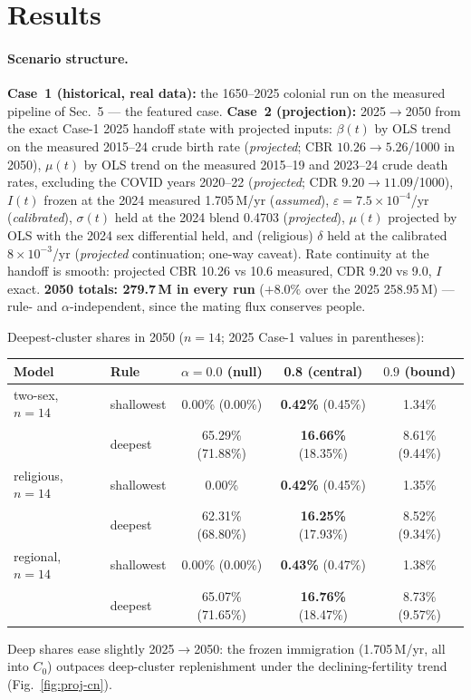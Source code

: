 \documentclass[11pt,a4paper]{article}
\begin{document}
\section{Results}
\label{sec:results}
\paragraph{Scenario structure.} \textbf{Case~1 (historical, real data):}
the 1650--2025 colonial run on the measured pipeline of Sec.~5 --- the
featured case.  \textbf{Case~2 (projection):} 2025$\to$2050 from the
exact Case-1 2025 handoff state with projected inputs: $\beta(t)$ by OLS
trend on the measured 2015--24 crude birth rate (\emph{projected}; CBR
$10.26\to5.26$/1000 in 2050), $\mu(t)$ by OLS trend on the measured
2015--19 and 2023--24 crude death rates, excluding the COVID years
2020--22 (\emph{projected}; CDR $9.20\to11.09$/1000), $I(t)$ frozen at
the 2024 measured 1.705\,M/yr (\emph{assumed}),
$\varepsilon=7.5\times10^{-4}$/yr (\emph{calibrated}),
$\sigma(t)$ held at the 2024 blend 0.4703 (\emph{projected}),
$\mu(t)$ projected by OLS with the 2024 sex differential held, and
(religious) $\delta$ held at the calibrated $8\times10^{-3}$/yr (\emph{projected}
continuation; one-way caveat).  Rate continuity at the handoff is smooth:
projected CBR 10.26 vs 10.6 measured, CDR 9.20 vs 9.0, $I$ exact.
\textbf{2050 totals: 279.7\,M in every run} ($+8.0\%$ over the 2025
258.95\,M) --- rule- and $\alpha$-independent, since the mating flux
conserves people.

Deepest-cluster shares in 2050 ($n=14$; 2025 Case-1 values in parentheses):

\begin{center}
\small
\begin{tabular}{@{}llccc@{}}
\toprule
Model & Rule & $\alpha{=}0.0$ (null) & \textbf{0.8} (central) & $0.9$ (bound) \\
\midrule
two-sex, $n{=}14$ & shallowest & 0.00\% (0.00\%) & \textbf{0.42\%} (0.45\%) & 1.34\% \\
                  & deepest & 65.29\% (71.88\%) & \textbf{16.66\%} (18.35\%) & 8.61\% (9.44\%) \\
religious, $n{=}14$ & shallowest & 0.00\% & \textbf{0.42\%} (0.45\%) & 1.35\% \\
                    & deepest & 62.31\% (68.80\%) & \textbf{16.25\%} (17.93\%) & 8.52\% (9.34\%) \\
regional, $n{=}14$ & shallowest & 0.00\% (0.00\%) & \textbf{0.43\%} (0.47\%) & 1.38\% \\
                   & deepest & 65.07\% (71.65\%) & \textbf{16.76\%} (18.47\%) & 8.73\% (9.57\%) \\
\bottomrule
\end{tabular}
\end{center}
Deep shares ease slightly 2025$\to$2050: the frozen immigration
(1.705\,M/yr, all into $C_0$) outpaces deep-cluster replenishment under
the declining-fertility trend (Fig.~\ref{fig:proj-cn}).
\end{document}
